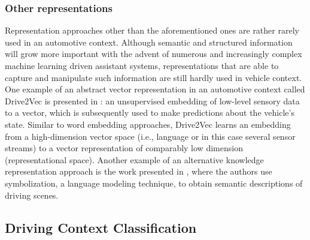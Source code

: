 \subsubsection{Other representations}

Representation approaches other than the aforementioned ones are rather rarely used in an automotive context.
Although semantic and structured information will grow more important with the advent of numerous and increasingly complex machine learning driven assistant systems, representations that are able to capture and manipulate such information are still hardly used in vehicle context.
One example of an abstract vector representation in an automotive context called Drive2Vec is presented in \textcite{Hallac2018}: an unsupervised embedding of low-level sensory data to a vector, which is subsequently used to make predictions about the vehicle's state.
Similar to word embedding approaches, Drive2Vec learns an embedding from a high-dimension vector space (i.e., language or in this case several sensor streams) to a vector representation of comparably low dimension (representational space).
Another example of an alternative knowledge representation approach is the work presented in \textcite{Yamazaki2016}, where the authors use symbolization, a language modeling technique, to obtain semantic descriptions of driving scenes.

\subsection{Driving Context Classification}%
\label{subsec:driving_context_classification}

